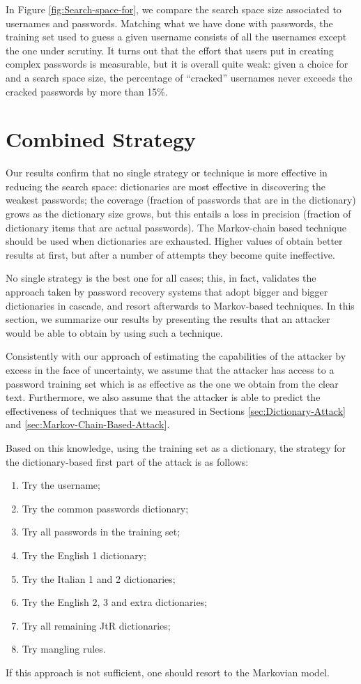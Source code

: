 \documentclass[a4paper,twocolumn]{article}
\begin{document}
In Figure \ref{fig:Search-space-for}, we compare the search space
size associated to usernames and passwords. Matching what we have
done with passwords, the training set used to guess a given username
consists of all the usernames except the one under scrutiny. It turns
out that the effort that users put in creating complex passwords is
measurable, but it is overall quite weak: given a choice for 
and a search space size, the percentage of {}``cracked'' usernames
never exceeds the cracked passwords by more than 15\%.


\section{Combined Strategy}

Our results confirm that no single strategy or technique is more effective
in reducing the search space: dictionaries are most effective in discovering
the weakest passwords; the coverage (fraction of passwords that are
in the dictionary) grows as the dictionary size grows, but this entails
a loss in precision (fraction of dictionary items that are actual
passwords). The Markov-chain based technique should be used when dictionaries
are exhausted. Higher values of  obtain better results at first,
but after a number of attempts they become quite ineffective.

No single strategy is the best one for all cases; this, in fact, validates
the approach taken by password recovery systems that adopt bigger
and bigger dictionaries in cascade, and resort afterwards to Markov-based
techniques. In this section, we summarize our results by presenting
the results that an attacker would be able to obtain by using such
a technique.

Consistently with our approach of estimating the capabilities of the
attacker by excess in the face of uncertainty, we assume that the
attacker has access to a password training set which is as effective
as the one we obtain from the clear text. Furthermore, we also assume
that the attacker is able to predict the effectiveness of techniques
that we measured in Sections \ref{sec:Dictionary-Attack} and \ref{sec:Markov-Chain-Based-Attack}.

Based on this knowledge, using the training set as a dictionary, the
strategy for the dictionary-based first part of the attack is as follows:
\begin{enumerate}
\item Try the username;
\item Try the common passwords dictionary;
\item Try all passwords in the training set;
\item Try the English 1 dictionary;
\item Try the Italian 1 and 2 dictionaries;
\item Try the English 2, 3 and extra dictionaries;
\item Try all remaining JtR dictionaries;
\item Try mangling rules.
\end{enumerate}
If this approach is not sufficient, one should resort to the Markovian
model.
\end{document}
